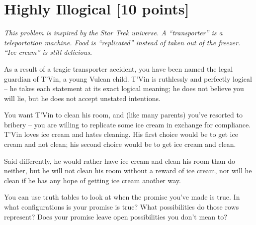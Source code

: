 \documentclass[homework, problems]{../../latex-common/cs151-common}
\begin{document}
\section{Highly Illogical \hfill [10 points]}
\begin{problemsonly}
\textit{This problem is inspired by the Star Trek universe. A
  ``transporter'' is a teleportation machine. Food is ``replicated''
  instead of taken out of the freezer. ``Ice cream'' is still
  delicious.}


As a result of a tragic transporter accident, you have been named the legal guardian of T'Vin, a young Vulcan child.  T'Vin is ruthlessly and perfectly logical -- he takes each statement at its exact logical
meaning; he does not believe you will lie, but he does not accept unstated intentions.

You want T'Vin to clean his room, and (like many parents) you've resorted to bribery -- you are willing to replicate some ice cream in exchange for compliance.  T'Vin loves ice cream and hates cleaning. His first choice would be to get ice cream and not clean; his second choice would be to get ice cream and clean. 

Said differently, he would rather have ice cream and clean his room than do neither, but he will not clean his room without a reward of ice cream, nor will he clean if he has any hope of getting ice cream another way. \\
\end{problemsonly}

\begin{hint}
You can use truth tables to look at when the promise you've made is true. In what configurations is your promise is true? What possibilities do those rows represent? Does your promise leave open possibilities you don't mean to?     
\end{hint}
\end{document}

